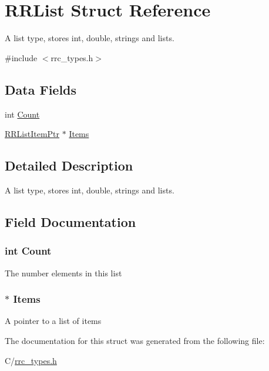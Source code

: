 \hypertarget{struct_r_r_list}{\section{R\-R\-List Struct Reference}
\label{struct_r_r_list}
}


A list type, stores int, double, strings and lists.  




{\ttfamily \#include $<$rrc\-\_\-types.\-h$>$}

\subsection*{Data Fields}
\begin{DoxyCompactItemize}
\item 
int \hyperlink{struct_r_r_list_aad462966ed963f892117056de1eba502}{Count}
\item 
\hyperlink{rrc__types_8h_a79938364b69256c42480bb3a29ebf73e}{R\-R\-List\-Item\-Ptr} $\ast$ \hyperlink{struct_r_r_list_ada0586e0d2f92ef7b364486c9e989fcf}{Items}
\end{DoxyCompactItemize}


\subsection{Detailed Description}
A list type, stores int, double, strings and lists. 

\subsection{Field Documentation}
\hypertarget{struct_r_r_list_aad462966ed963f892117056de1eba502}{
\subsubsection[{Count}]{\setlength{\rightskip}{0pt plus 5cm}int Count}}\label{struct_r_r_list_aad462966ed963f892117056de1eba502}
The number elements in this list \hypertarget{struct_r_r_list_ada0586e0d2f92ef7b364486c9e989fcf}{
\subsubsection[{Items}]{$\ast$ Items}}\label{struct_r_r_list_ada0586e0d2f92ef7b364486c9e989fcf}
A pointer to a list of items 

The documentation for this struct was generated from the following file\-:\begin{DoxyCompactItemize}
\item 
C/\hyperlink{rrc__types_8h}{rrc\-\_\-types.\-h}\end{DoxyCompactItemize}
